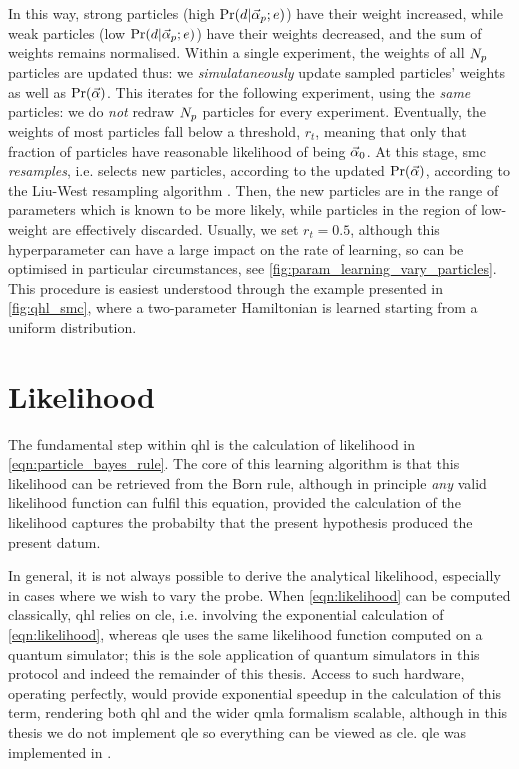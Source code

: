 In this way, strong particles (high $\Pr(d | \vec{\alpha}_p; e)$) have their weight increased, 
    while weak particles (low $\Pr(d | \vec{\alpha}_p; e)$) have their weights decreased, 
    and the sum of weights remains normalised. 
Within a single experiment, the weights of all $N_p$ particles are updated thus:
    we \emph{simulataneously} update sampled particles' weights as well as $\Pr(\vec{\alpha})$. 
This iterates for the following experiment, using the \emph{same} particles: 
    we do \emph{not} redraw $N_p$ particles for every experiment.
Eventually, the weights of most particles fall below a threshold, $r_t$, 
    meaning that only that fraction of particles have reasonable likelihood of being $\vec{\alpha}_0$.
At this stage, \gls{smc} \emph{resamples}, i.e. selects new particles, according to the updated $\Pr(\vec{\alpha})$,
    according to the Liu-West resampling algorithm \cite{liu2001combined}.
Then, the new particles are in the range of parameters which is known to be more likely, 
    while particles in the region of low-weight are effectively discarded. 
Usually, we set $r_t=0.5$, although this \gls{hyperparameter} can have a large impact 
    on the rate of learning, so can be optimised in particular circumstances, 
    see \cref{fig:param_learning_vary_particles}.
This procedure is easiest understood through the example presented in \cref{fig:qhl_smc}, 
    where a two-parameter Hamiltonian is learned starting from a uniform distribution. 


\section{Likelihood}\label{sec:likelihood}
The fundamental step within \gls{qhl} is the calculation of \gls{likelihood} in \cref{eqn:particle_bayes_rule}. 
The core of this learning algorithm is that this \gls{likelihood} can be retrieved from the Born rule, 
    although in principle \emph{any} valid likelihood function can fulfil this equation, 
    provided the calculation of the likelihood captures the probabilty that the present hypothesis produced the present datum.

In general, it is not always possible to derive the analytical likelihood, 
    especially in cases where we wish to vary the \gls{probe}.
When \cref{eqn:likelihood} can be computed classically, 
    \gls{qhl} relies on \gls{cle}, i.e. involving the exponential calculation of \cref{eqn:likelihood}, 
    whereas \gls{qle} uses the same likelihood function computed on a quantum simulator; 
    this is the sole application of quantum simulators in this protocol and indeed the remainder of this thesis. 
Access to such hardware, operating perfectly, would provide exponential speedup in the calculation of this term, 
    rendering both \gls{qhl} and the wider \gls{qmla} formalism scalable,
    although in this thesis we do not implement \gls{qle} so everything can be viewed as \gls{cle}. 
\gls{qle} was implemented in \cite{wang2017experimental}. 
\par 

